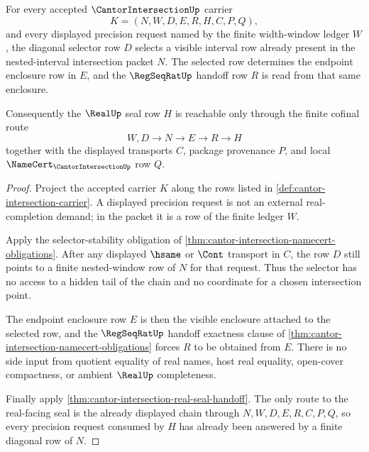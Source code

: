 \begin{theorem}
\label{thm:cantor-intersection-diagonal-cofinal-readback}
For every accepted $\CantorIntersectionUp$ carrier
$$
K=(N,W,D,E,R,H,C,P,Q),
$$
and every displayed precision request named by the finite width-window ledger $W$, the diagonal selector row $D$ selects a visible interval row already present in the nested-interval intersection packet $N$. The selected row determines the endpoint enclosure row in $E$, and the $\RegSeqRatUp$ handoff row $R$ is read from that same enclosure.

Consequently the $\RealUp$ seal row $H$ is reachable only through the finite cofinal route
$$
W,D \longrightarrow N \longrightarrow E \longrightarrow R \longrightarrow H
$$
together with the displayed transports $C$, package provenance $P$, and local $\NameCert_{\CantorIntersectionUp}$ row $Q$.
\end{theorem}
\begin{proof}
Project the accepted carrier $K$ along the rows listed in \autoref{def:cantor-intersection-carrier}. A displayed precision request is not an external real-completion demand; in the packet it is a row of the finite ledger $W$.

Apply the selector-stability obligation of \autoref{thm:cantor-intersection-namecert-obligations}. After any displayed $\hsame$ or $\Cont$ transport in $C$, the row $D$ still points to a finite nested-window row of $N$ for that request. Thus the selector has no access to a hidden tail of the chain and no coordinate for a chosen intersection point.

The endpoint enclosure row $E$ is then the visible enclosure attached to the selected row, and the $\RegSeqRatUp$ handoff exactness clause of \autoref{thm:cantor-intersection-namecert-obligations} forces $R$ to be obtained from $E$. There is no side input from quotient equality of real names, host real equality, open-cover compactness, or ambient $\RealUp$ completeness.

Finally apply \autoref{thm:cantor-intersection-real-seal-handoff}. The only route to the real-facing seal is the already displayed chain through $N,W,D,E,R,C,P,Q$, so every precision request consumed by $H$ has already been answered by a finite diagonal row of $N$.
\end{proof}

